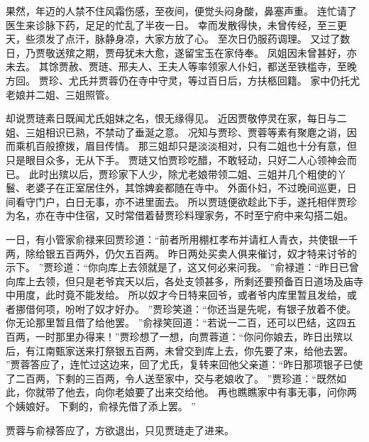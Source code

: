 果然，年迈的人禁不住风霜伤感，至夜间，便觉头闷身酸，鼻塞声重。
连忙请了医生来诊脉下药，足足的忙乱了半夜一日。
幸而发散得快，未曾传经，至三更天，些须发了点汗，脉静身凉，大家方放了心。
至次日仍服药调理。
又过了数日，乃贾敬送殡之期，贾母犹未大愈，遂留宝玉在家侍奉。
凤姐因未曾甚好，亦未去。
其馀贾赦、贾琏、邢夫人、王夫人等率领家人仆妇，都送至铁槛寺，至晚方回。
贾珍、尤氏并贾蓉仍在寺中守灵，等过百日后，方扶柩回籍。
家中仍托尤老娘并二姐、三姐照管。
\par
却说贾琏素日既闻尤氏姐妹之名，恨无缘得见。
近因贾敬停灵在家，每日与二姐、三姐相识已熟，不禁动了垂涎之意。
况知与贾珍、贾蓉等素有聚麀之诮，因而乘机百般撩拨，眉目传情。
那三姐却只是淡淡相对，只有二姐也十分有意，但只是眼目众多，无从下手。
贾琏又怕贾珍吃醋，不敢轻动，只好二人心领神会而已。
此时出殡以后，贾珍家下人少，除尤老娘带领二姐、三姐并几个粗使的丫鬟、老婆子在正室居住外，其馀婢妾都随在寺中。
外面仆妇，不过晚间巡更，日间看守门户，白日无事，亦不进里面去。
所以贾琏便欲趁此下手，遂托相伴贾珍为名，亦在寺中住宿，又时常借着替贾珍料理家务，不时至宁府中来勾搭二姐。
\par
一日，有小管家俞禄来回贾珍道：“前者所用棚杠孝布并请杠人青衣，共使银一千两，除给银五百两外，仍欠五百两。
昨日两处买卖人俱来催讨，奴才特来讨爷的示下。
”贾珍道：“你向库上去领就是了，这又何必来问我。
”俞禄道：“昨日已曾向库上去领，但只是老爷宾天以后，各处支领甚多，所剩还要预备百日道场及庙寺中用度，此时竟不能发给。
所以奴才今日特来回爷，或者爷内库里暂且发给，或者挪借何项，吩咐了奴才好办。
”贾珍笑道：“你还当是先呢，有银子放着不使。
你无论那里暂且借了给他罢。
”俞禄笑回道：“若说一二百，还可以巴结，这四五百两，一时那里办得来！”贾珍想了一想，向贾蓉道：“你问你娘去，昨日出殡以后，有江南甄家送来打祭银五百两，未曾交到库上去，你先要了来，给他去罢。
”贾蓉答应了，连忙过这边来，回了尤氏，复转来回他父亲道：“昨日那项银子已使了二百两，下剩的三百两，令人送至家中，交与老娘收了。
”贾珍道：“既然如此，你就带了他去，向你老娘要了出来交给他。
再也瞧瞧家中有事无事，问你两个姨娘好。
下剩的，俞禄先借了添上罢。
”\par
贾蓉与俞禄答应了，方欲退出，只见贾琏走了进来。

